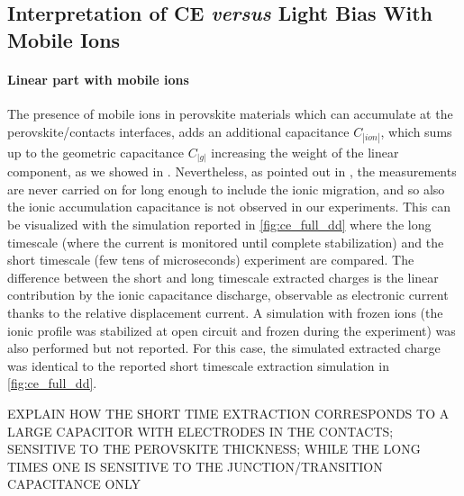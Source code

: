 	\subsection{Interpretation of CE \textsl{versus} Light Bias With Mobile Ions}

		\paragraph{Linear part with mobile ions}\label{ce_ions_linear}
		The presence of mobile ions in perovskite materials which can accumulate at the perovskite/contacts interfaces, adds an additional capacitance $C_|ion|$, which sums up to the geometric capacitance $C_|g|$ increasing the weight of the linear component, as we showed in .
		Nevertheless, as pointed out in , the  measurements are never carried on for long enough to include the ionic migration, and so also the ionic accumulation capacitance is not observed in our experiments.
		This can be visualized with the simulation reported in \cref{fig:ce_full_dd} where the long timescale (where the current is monitored until complete stabilization) and the short timescale (few tens of microseconds)  experiment are compared.
		The difference between the short and long timescale extracted charges is the linear contribution by the ionic capacitance discharge, observable as electronic current thanks to the relative displacement current.
		A simulation with frozen ions (the ionic profile was stabilized at open circuit and frozen during the  experiment) was also performed but not reported.
		For this case, the simulated extracted charge was identical to the reported short timescale extraction simulation in \cref{fig:ce_full_dd}.

		EXPLAIN HOW THE SHORT TIME EXTRACTION CORRESPONDS TO A LARGE CAPACITOR WITH ELECTRODES IN THE CONTACTS; SENSITIVE TO THE PEROVSKITE THICKNESS; WHILE THE LONG TIMES ONE IS SENSITIVE TO THE JUNCTION/TRANSITION CAPACITANCE ONLY

